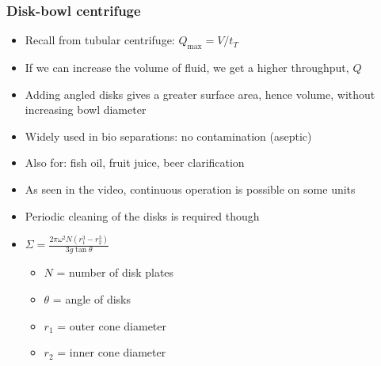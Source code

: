 \begin{frame}\frametitle{Disk-bowl centrifuge}
	\begin{itemize}		
		\item	Recall from tubular centrifuge: $Q_\text{max} = V / t_T$
		\item	If we can increase the volume of fluid, we get a higher throughput, $Q$
		\item	Adding angled disks gives a greater surface area, hence volume, without increasing bowl diameter
		\item	Widely used in bio separations: no contamination (aseptic) 
		\item	Also for: fish oil, fruit juice, beer clarification
		\item	As seen in the video, continuous operation is possible on some units
		\item	Periodic cleaning of the disks is required though
		\item	$\Sigma = \displaystyle \frac{2\pi\omega^2 N(r_1^3 - r_2^3)}{3g \tan \theta}$
			\begin{itemize}
				\item	$N$ = number of disk plates
				\item	$\theta$ = angle of disks
				\item	$r_1$ = outer cone diameter
				\item	$r_2$ = inner cone diameter
			\end{itemize}
	\end{itemize}
\end{frame}

